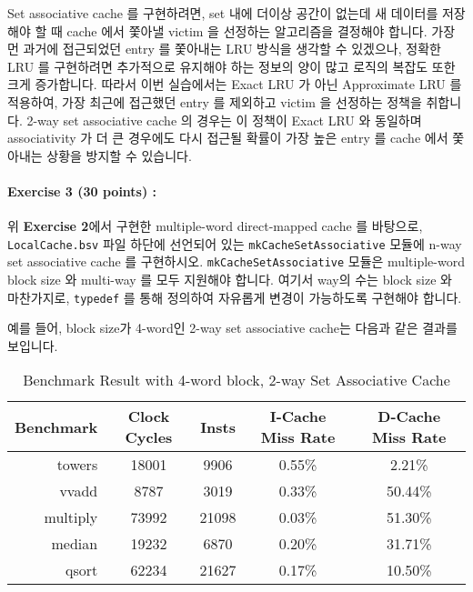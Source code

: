 \documentclass{article}
\begin{document}
Set associative cache 를 구현하려면, set 내에 더이상 공간이 없는데 새 데이터를 저장해야
할 때 cache 에서 쫓아낼 victim 을 선정하는 알고리즘을 결정해야 합니다.
가장 먼 과거에 접근되었던 entry 를 쫓아내는 LRU 방식을 생각할 수 있겠으나,
정확한 LRU 를 구현하려면 추가적으로 유지해야 하는 정보의 양이 많고
로직의 복잡도 또한 크게 증가합니다. 따라서 이번 실습에서는 Exact LRU 가 아닌
Approximate LRU 를 적용하여, 가장 최근에 접근했던 entry 를 제외하고 victim 을 선정하는
정책을 취합니다. 2-way set associative cache 의 경우는 이 정책이 Exact LRU 와 동일하며
associativity 가 더 큰 경우에도 다시 접근될 확률이 가장 높은 entry 를 
cache 에서 쫓아내는 상황을 방지할 수 있습니다.

\noindent \paragraph{\bf Exercise 3 (30 points) :} 
위 \textbf{Exercise 2}에서 구현한 multiple-word direct-mapped cache 를 바탕으로,
\texttt{LocalCache.bsv} 파일 하단에 선언되어 있는 \texttt{mkCacheSetAssociative} 모듈에
n-way set associative cache 를 구현하시오.
\texttt{mkCacheSetAssociative} 모듈은 multiple-word block size 와 multi-way 를 모두 지원해야 합니다.
여기서 way의 수는 block size 와 마찬가지로, \texttt{typedef} 를 통해 정의하여
자유롭게 변경이 가능하도록 구현해야 합니다.

\newpage
예를 들어, block size가 4-word인 2-way set associative cache는 다음과 같은 결과를 보입니다.

\begin{table}[ht]
\centering
\begin{tabular}{|r|c|c|c|c|}
\hline
Benchmark & Clock Cycles & Insts & I-Cache Miss Rate & D-Cache Miss Rate \\
\hline
towers & 18001 & 9906 & 0.55\% & 2.21\%\\
 vvadd & 8787 & 3019 & 0.33\% & 50.44\% \\
multiply & 73992 & 21098 & 0.03\% & 51.30\% \\
  median & 19232 & 6870 & 0.20\% & 31.71\% \\
   qsort & 62234 & 21627 & 0.17\% & 10.50\% \\
\hline
\end{tabular}
\caption{Benchmark Result with 4-word block, 2-way Set Associative Cache}
\end{table}
\end{document}
